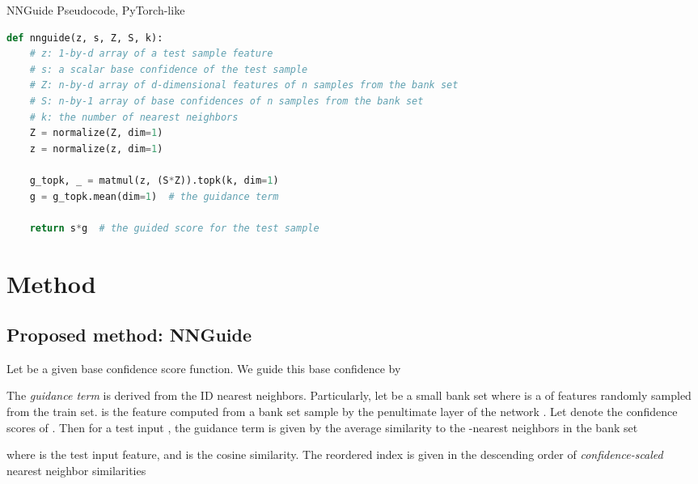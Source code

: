 \documentclass[10pt,twocolumn,letterpaper]{article}
\begin{document}
\begin{algorithm}[t]
\caption{NNGuide Pseudocode, PyTorch-like}
\label{alg:code}
\begin{lstlisting}[language=python]
def nnguide(z, s, Z, S, k):
    # z: 1-by-d array of a test sample feature
    # s: a scalar base confidence of the test sample
    # Z: n-by-d array of d-dimensional features of n samples from the bank set
    # S: n-by-1 array of base confidences of n samples from the bank set
    # k: the number of nearest neighbors
    Z = normalize(Z, dim=1) 
    z = normalize(z, dim=1)

    g_topk, _ = matmul(z, (S*Z)).topk(k, dim=1)
    g = g_topk.mean(dim=1)  # the guidance term
    
    return s*g  # the guided score for the test sample
\end{lstlisting}
\end{algorithm}


\section{Method}
\label{sec:method}





\subsection{Proposed method: NNGuide}
Let  be a given base confidence score function. We guide this base confidence by 

The \textit{guidance term}  is derived from the ID nearest neighbors. Particularly, let  be a small bank set where  is a  of features randomly sampled from the train set.  is the feature computed from a bank set sample  by the penultimate layer of the network . Let  denote the confidence scores of . Then for a test input , the guidance term  is given by the average similarity to the -nearest neighbors in the bank set

where  is the test input feature, and  is the cosine similarity. The reordered index  is given in the descending order of \textit{confidence-scaled} nearest neighbor similarities
\end{document}
